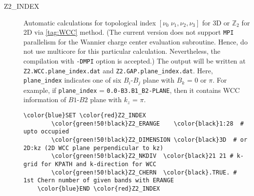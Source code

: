 \documentclass[a4paper,12pt]{scrartcl}
\makeatletter
\def\namedlabel#1#2{\begingroup
    #2%
    \def\@currentlabel{#2}%
    \phantomsection\label{#1}\endgroup
}
\newcommand{\textgreen}[1]{\textcolor{green!50!black}{\texttt{#1}}}
\makeatother
\begin{document}
\begin{description}
    \item[\namedlabel{tag:Z2}{Z2\_INDEX}] Automatic calculations for topological index 
        $[\nu_0\; \nu_1, \nu_2, \nu_3]$ for 3D or $\mathbb{Z}_{2}$ for 2D via \ref{tag:WCC} method. 
  		(The current version does not support
        \texttt{MPI} parallelism for the Wannier charge center evaluation subroutine.
        Hence, do not use multicore for this particular calculation.
        Nevertheless, the compilation with \texttt{-DMPI} option is accepted.)
        The output will be written at \texttt{Z2.WCC.}\textgreen{plane\_index}\texttt{.dat} and
        \texttt{Z2.GAP.}\textgreen{plane\_index}\texttt{.dat}.
        Here, \textgreen{plane\_index} indicates one of six $B_i$-$B_j$ plane with $B_k$ = 0 or $\pi$.
        For example, if \textgreen{plane\_index} = \textgreen{0.0-B3.B1\_B2-PLANE}, then it contains
        WCC information of $B1$-$B2$ plane with $k_z$ = $\pi$.
        
 \begin{Verbatim}[commandchars=\\\{\},gobble=4, frame=single, framesep=2mm, 
    label= Z2 index calculation using WCC method,
    labelposition=bottomline]
    \color{blue}SET \color{red}Z2_INDEX
        \color{green!50!black}Z2_ERANGE    \color{black}1:28  # upto occupied
        \color{green!50!black}Z2_DIMENSION \color{black}3D  # or 2D:kz (2D WCC plane perpendicular to kz)
        \color{green!50!black}Z2_NKDIV  \color{black}21 21 # k-grid for KPATH and k-direction for WCC
        \color{green!50!black}Z2_CHERN  \color{black}.TRUE. # 1st Chern number of given bands with ERANGE
    \color{blue}END \color{red}Z2_INDEX
 \end{Verbatim}


\end{description}
\end{document}
